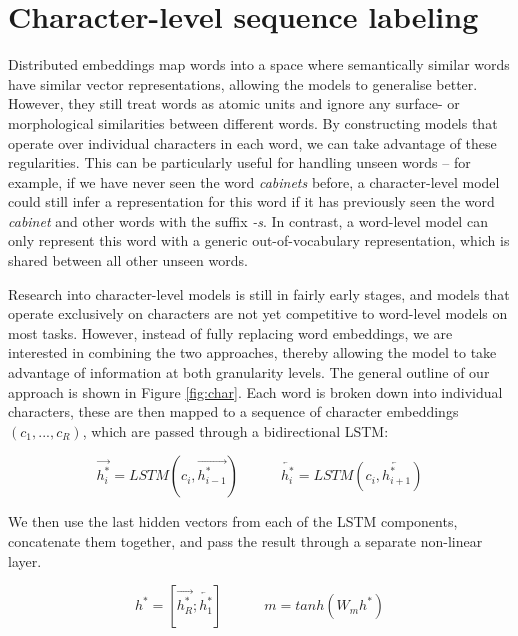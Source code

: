 \documentclass[11pt]{article}
\begin{document}
\section{Character-level sequence labeling}
\label{sec:concat}

Distributed embeddings map words into a space where semantically similar words have similar vector representations, allowing the models to generalise better.
However, they still treat words as atomic units and ignore any surface- or morphological similarities between different words. By constructing models that operate over individual characters in each word, we can take advantage of these regularities. This can be particularly useful for handling unseen words -- for example, if we have never seen the word \textit{cabinets} before, a character-level model could still infer a representation for this word if it has previously seen the word \textit{cabinet} and other words with the suffix \textit{-s}. In contrast, a word-level model can only represent this word with a generic out-of-vocabulary representation, which is shared between all other unseen words.

Research into character-level models is still in fairly early stages, and models that operate exclusively on characters are not yet competitive to word-level models on most tasks. However, instead of fully replacing word embeddings, we are interested in combining the two approaches, thereby allowing the model to take advantage of information at both granularity levels.
The general outline of our approach is shown in Figure \ref{fig:char}. Each word is broken down into individual characters, these are then mapped to a sequence of character embeddings $(c_1, ..., c_R)$, which are passed through a bidirectional LSTM:

\begin{equation}
\overrightarrow{h^*_i} = LSTM(c_i, \overrightarrow{h^*_{i-1}}) \hspace{3em}
\overleftarrow{h^*_i} = LSTM(c_i, \overleftarrow{h^*_{i+1}})
\end{equation}

We then use the last hidden vectors from each of the LSTM components, concatenate them together, and pass the result through a separate non-linear layer.

\begin{equation}
h^* = [\overrightarrow{h^*_R};\overleftarrow{h^*_1}] \hspace{3em}
m = tanh(W_m h^*)
\end{equation}
\end{document}
